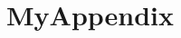 \documentclass[
    11pt,
    a4paper,
    class=article,
    crop=false
]{standalone}
\begin{document}
\section{MyAppendix}\label{sec:appendix}
\end{document}
